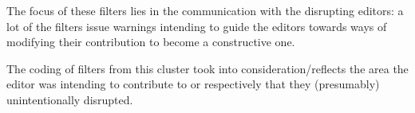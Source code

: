 The focus of these filters lies in the communication with the disrupting editors:
a lot of the filters issue warnings intending to guide the editors towards ways of modifying their contribution to become a constructive one.

The coding of filters from this cluster took into consideration/reflects the area the editor was intending to contribute to or respectively that they (presumably) unintentionally disrupted.

